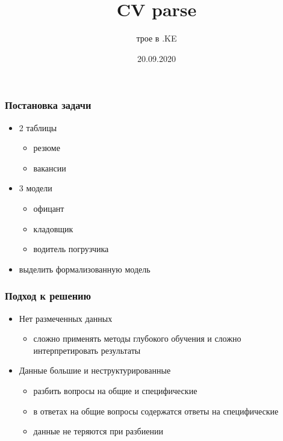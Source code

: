 \documentclass[xcolor=table,xetex,mathserif,serif]{beamer}
\title{CV parse}
\author[трое в .KE]{трое в .KE}
\date{20.09.2020}
\begin{document}
\begin{frame}
	\titlepage{}
\end{frame}


\begin{frame}
	\frametitle{Постановка задачи}

	\begin{itemize}
		\item 2 таблицы
		      \begin{itemize}
			      \item резюме
			      \item вакансии
		      \end{itemize}
		\item 3 модели
		      \begin{itemize}
			      \item офицант
			      \item кладовщик
			      \item водитель погрузчика
		      \end{itemize}
		\item выделить формализованную модель
	\end{itemize}
\end{frame}


\begin{frame}
	\frametitle{Подход к решению}

	\begin{itemize}
		\item Нет размеченных данных
            \begin{itemize}
                \item сложно применять методы глубокого обучения и сложно интерпретировать результаты
            \end{itemize}
		\item Данные большие и неструктурированные
		      \begin{itemize}
			      \item разбить вопросы на общие и специфические
			      \item в ответах на общие вопросы содержатся ответы на специфические
			      \item данные не теряются при разбиении
		      \end{itemize}
	\end{itemize}
\end{frame}
\end{document}
